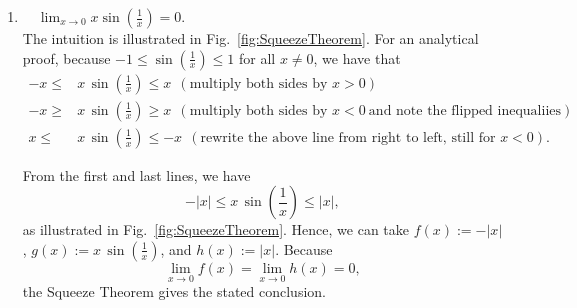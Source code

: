 \begin{enumerate}
\renewcommand{\labelenumi}{(\alph{enumi})}
\setlength{\itemsep}{.2cm}

    \item \Ans~~$\displaystyle \lim_{x \to 0} x \sin(\frac{1}{x}) =0$.\\

    The intuition is illustrated in Fig.~\ref{fig:SqueezeTheorem}. For an analytical proof, because $-1 \le \sin(\frac{1}{x}) \le 1$ for all $x\neq 0$, we have that
    \begin{align*}
        -x \le &x\, \sin(\frac{1}{x}) \le x ~~(\text{multiply both sides by }x>0) \\
         -x \ge &x\, \sin(\frac{1}{x}) \ge x ~~(\text{multiply both sides by } x < 0~\text{and note the flipped inequaliies})
         \\
         x \le &x\, \sin(\frac{1}{x}) \le -x ~~(\text{rewrite the above line from right to left, still for } x < 0).         
    \end{align*}

From the first and last lines, we have
    $$ -|x| \le x \, \sin(\frac{1}{x}) \le|x|, $$
    as illustrated in Fig.~\ref{fig:SqueezeTheorem}. Hence, we can take $f(x):= -|x|$, $g(x):=x\, \sin(\frac{1}{x})$, and $h(x):= |x|$. Because
    $$\lim_{x \to 0}f(x) =  \lim_{x \to 0}h(x) = 0,$$
    the Squeeze Theorem gives the stated conclusion. 



\end{enumerate}
